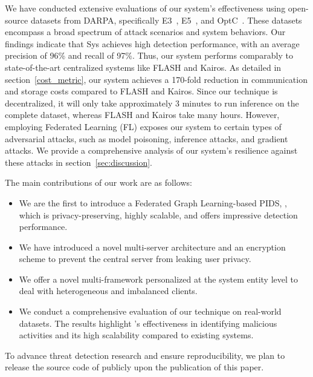 

We have conducted extensive evaluations of our system's effectiveness using open-source datasets from DARPA, specifically E3~\cite{darpae3}, E5~\cite{darpae5}, and OptC~\cite{anjum2021analyzing}. These datasets encompass a broad spectrum of attack scenarios and system behaviors. Our findings indicate that Sys achieves high detection performance, with an average precision of 96\% and recall of 97\%. Thus, our system performs comparably to state-of-the-art centralized systems like FLASH and Kairos. As detailed in section~\ref{cost_metric}, our system achieves a 170-fold reduction in communication and storage costs compared to FLASH and Kairos. Since our technique is decentralized, it will only take approximately 3 minutes to run inference on the complete \optc dataset, whereas FLASH and Kairos take many hours. However, employing Federated Learning (FL) exposes our system to certain types of adversarial attacks, such as model poisoning, inference attacks, and gradient attacks. We provide a comprehensive analysis of our system's resilience against these attacks in section~\ref{sec:discussion}.


The main contributions of our work are as follows:

\begin{itemize}[topsep=.1ex,itemsep=-.1ex,leftmargin=*]
    \item We are the first to introduce a Federated Graph Learning-based PIDS, \Sys, which is privacy-preserving, highly scalable, and offers impressive detection performance.
    \item We have introduced a novel multi-server architecture and an encryption scheme to prevent the central server from leaking user privacy.
    \item We offer a novel multi-\gnnshort framework personalized at the system entity level to deal with heterogeneous and imbalanced clients.
    \item We conduct a comprehensive evaluation of our technique on real-world datasets. The results highlight \Sys's effectiveness in identifying malicious activities and its high scalability compared to existing systems.
\end{itemize}

 To advance threat detection research and ensure reproducibility, we plan to release the source code of \Sys publicly upon the publication of this paper.